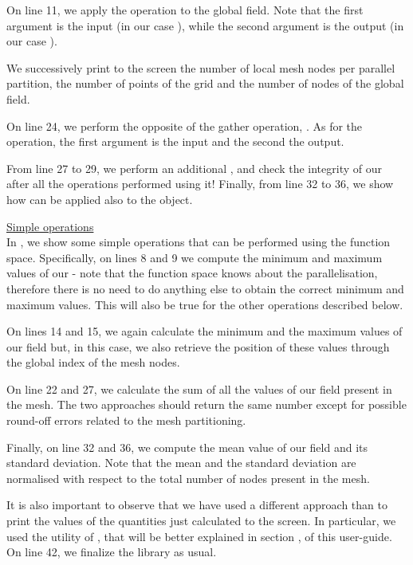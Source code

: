 \begin{description}
On line 11, we apply the  operation to the global field.
Note that the first argument is the input (in our case ),
while the second argument is the output (in our case ).

We successively print to the screen the number of local mesh nodes 
per parallel partition, the number of points of the grid and the 
number of nodes of the global field.

On line 24, we perform the opposite of the gather operation, 
. As for the  operation, the 
first argument is the input and the second the output.

From line 27 to 29, we perform an additional , 
and check the integrity of our  after all the 
operations performed using it! 
Finally, from line 32 to 36, we show how  can be applied 
also to the  object.

%

%
%
\item \underline{Simple operations}\\[0.5em]
%
In , we show some simple operations that 
can be performed using the  function space. Specifically, 
on lines 8 and 9 we compute the minimum and maximum values of our 
 - note that the function space knows about 
the parallelisation, therefore there is no need to do anything 
else to obtain the correct minimum and maximum values. This will
also be true for the other operations described below.

On lines 14 and 15, we again calculate the minimum and the maximum 
values of our field but, in this case, we also retrieve the position 
of these values through the global index of the mesh nodes.

On line 22 and 27, we calculate the sum of all the values of our 
field present in the mesh. The two approaches should return the 
same number except for possible round-off errors related to the 
mesh partitioning.

Finally, on line 32 and 36, we compute the mean value of our
field and its standard deviation. Note that the mean and the 
standard deviation are normalised with respect to the total 
number of nodes present in the mesh.

It is also important to observe that we have used a different 
approach than  to print the values of the quantities 
just calculated to the screen. In particular, we used the 
 utility of \Atlas, that will be better 
explained in section , of this user-guide.
On line 42, we finalize the library as usual.
%

%
\end{description}
